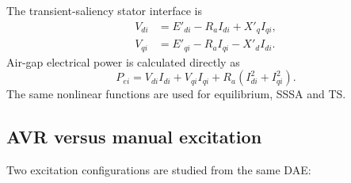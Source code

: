 \documentclass[12pt,a4paper]{article}
\begin{document}
The transient-saliency stator interface is
\begin{align}
V_{di}&=E'_{di}-R_aI_{di}+X'_qI_{qi},\\
V_{qi}&=E'_{qi}-R_aI_{qi}-X'_dI_{di}.
\end{align}
Air-gap electrical power is calculated directly as
\begin{equation}
P_{ei}=V_{di}I_{di}+V_{qi}I_{qi}+R_a(I_{di}^2+I_{qi}^2).
\end{equation}
The same nonlinear functions are used for equilibrium, SSSA and TS.

\subsection{AVR versus manual excitation}

Two excitation configurations are studied from the same DAE:
\end{document}
